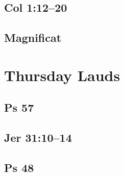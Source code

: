 {%
\parindent 0pt
\noindent
\ifx\preLilyPondExample \undefined
\else
  \expandafter\preLilyPondExample
\fi
\def\lilypondbook{}%

\ifx\postLilyPondExample \undefined
\else
  \expandafter\postLilyPondExample
\fi
}

\subsection{Col 1:12--20}

{%
\parindent 0pt
\noindent
\ifx\preLilyPondExample \undefined
\else
  \expandafter\preLilyPondExample
\fi
\def\lilypondbook{}%

\ifx\postLilyPondExample \undefined
\else
  \expandafter\postLilyPondExample
\fi
}

\subsection{Magnificat}

{%
\parindent 0pt
\noindent
\ifx\preLilyPondExample \undefined
\else
  \expandafter\preLilyPondExample
\fi
\def\lilypondbook{}%

\ifx\postLilyPondExample \undefined
\else
  \expandafter\postLilyPondExample
\fi
}


\section{Thursday Lauds}

\subsection{Ps 57}

{%
\parindent 0pt
\noindent
\ifx\preLilyPondExample \undefined
\else
  \expandafter\preLilyPondExample
\fi
\def\lilypondbook{}%

\ifx\postLilyPondExample \undefined
\else
  \expandafter\postLilyPondExample
\fi
}

\subsection{Jer 31:10--14}

{%
\parindent 0pt
\noindent
\ifx\preLilyPondExample \undefined
\else
  \expandafter\preLilyPondExample
\fi
\def\lilypondbook{}%

\ifx\postLilyPondExample \undefined
\else
  \expandafter\postLilyPondExample
\fi
}

\subsection{Ps 48}

